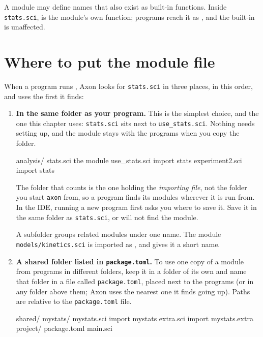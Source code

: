 \documentclass[11pt,a4paper,openany]{report}
\begin{document}
{{A module may define names that also exist as built-in functions. Inside
\texttt{stats.sci},  is the module's own function; programs reach it
as , and the built-in  is unaffected.

\section{Where to put the module file}\label{sec:modwhere}

When a program runs , Axon looks for \texttt{stats.sci}
in three places, in this order, and uses the first it finds:

\begin{enumerate}
\item \textbf{In the same folder as your program.} This is the
  simplest choice, and the one this chapter uses: \texttt{stats.sci} sits next
  to \texttt{use\_stats.sci}. Nothing needs setting up, and the module stays
  with the programs when you copy the folder.

\begin{shell}
analysis/
  stats.sci           the module
  use_stats.sci       import stats
  experiment2.sci     import stats
\end{shell}

  The folder that counts is the one holding the \emph{importing file}, not
  the folder you start \texttt{axon} from, so a program finds its modules
  wherever it is run from. In the IDE, running a new program first asks
  you where to save it. Save it in the same folder as \texttt{stats.sci}, or
   will not find the module.

  A subfolder groups related modules under one name. The module
  \texttt{models/kinetics.sci} is imported as , and
   gives it a short name.

\item \textbf{A shared folder listed in \texttt{package.toml}.} To use one copy
  of a module from programs in different folders, keep it in a folder of its
  own and name that folder in a file called \texttt{package.toml}, placed next
  to the programs (or in any folder above them; Axon uses the nearest one it
  finds going up). Paths are relative to the \texttt{package.toml} file.

\begin{shell}
shared/
  mystats/
    mystats.sci       import mystats
    extra.sci         import mystats.extra
project/
  package.toml
  main.sci
\end{shell}


\end{enumerate}}}
\end{document}
